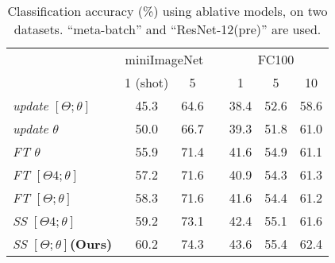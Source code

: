 \begin{table}[b]
\centering
\vspace{-0.4cm}
\small
\begin{tabular*}{8cm}
{lcccccc}
\toprule 
& \multicolumn{2}{c}{miniImageNet} & & \multicolumn{3}{c}{FC100} \\
\cmidrule{2-3}\cmidrule{5-7}
& 1 (shot) & 5 & & 1 & 5 & 10 \\
\midrule[1pt]
\emph{update} $[\Theta; \theta]$ & 45.3 & 64.6  & & 38.4 & 52.6 & 58.6 \\
\emph{update} $\theta$ & 50.0 & 66.7  & & 39.3 & 51.8 & 61.0 \\
\midrule[1pt]	
\emph{FT} $\theta$  & 55.9 & 71.4  & & 41.6 & 54.9 & 61.1 \\
\emph{FT} $[\Theta4; \theta]$ & 57.2 & 71.6 & & 40.9 & 54.3 & 61.3 \\
\emph{FT} $[\Theta; \theta]$  & 58.3 & 71.6  & & 41.6 & 54.4 & 61.2 \\
\midrule[1pt]
\emph{SS} $[\Theta4; \theta]$ & 59.2 & 73.1  & &42.4 &55.1 &61.6 \\
\emph{SS $[\Theta; \theta]$}\textbf{(Ours)} & 60.2 & 74.3 & & 43.6 & 55.4 & 62.4  \\
\bottomrule[1pt]
\end{tabular*}
\vspace{0.1cm}
\caption{Classification accuracy (\%) using ablative models, on two datasets. ``meta-batch'' and ``ResNet-12(pre)'' are used.}
\label{tab_ablation_study}
\end{table}